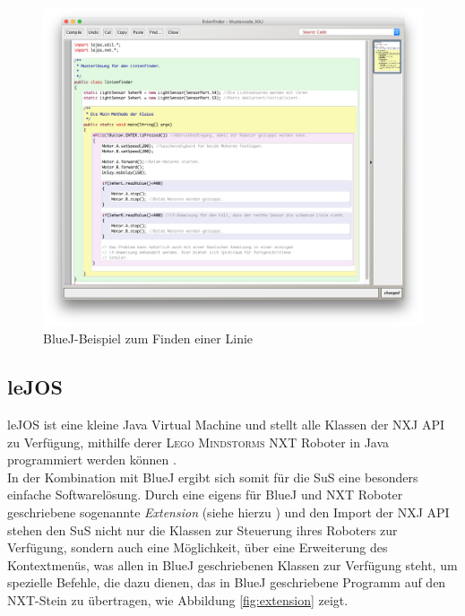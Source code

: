 \documentclass[paper=a4, pagesize, DIV=calc, BCOR=15mm, twoside=on, onecolumn=on, open = right, titlepage =on, parskip =half-, headsepline = on, footsepline = on, chapterprefix = on, appendixprefix = off, fontsize = 12pt, numbers = noenddot, abstract = on]{scrbook}
\numberwithin{equation}{chapter}
\theoremstyle{definition}
\theoremstyle{plain}
\theoremstyle{plain}
\theoremstyle{remark}
\theoremstyle{plain}
\theoremstyle{plain}
\begin{document}
\begin{figure}[htpb]
\centering
\includegraphics[scale=0.35]{images/linienfinder_bluej.png} 
\caption{BlueJ-Beispiel zum Finden einer Linie}
\label{fig:Bsp BlueJ Linienfinder}
\end{figure}



\par \singlespacing
\subsection{leJOS}
\label{sec:lejos}
\onehalfspacing
leJOS ist eine kleine Java Virtual Machine und stellt alle Klassen der NXJ API zu Verfügung, mithilfe derer \textsc{Lego Mindstorms} NXT Roboter in Java programmiert werden können \cite{lejos}.\\
In der Kombination mit BlueJ ergibt sich somit für die SuS eine besonders einfache Softwarelösung. Durch eine eigens für BlueJ und NXT Roboter geschriebene sogenannte \textit{Extension} (siehe hierzu \cite{bowes:12}) und den Import der NXJ API stehen den SuS nicht nur die Klassen zur Steuerung ihres Roboters zur Verfügung, sondern auch eine Möglichkeit, über eine Erweiterung des Kontextmenüs, was allen in BlueJ geschriebenen Klassen zur Verfügung steht, um spezielle Befehle, die dazu dienen, das in BlueJ geschriebene Programm auf den NXT-Stein zu übertragen, wie Abbildung \ref{fig:extension} zeigt.
\end{document}
